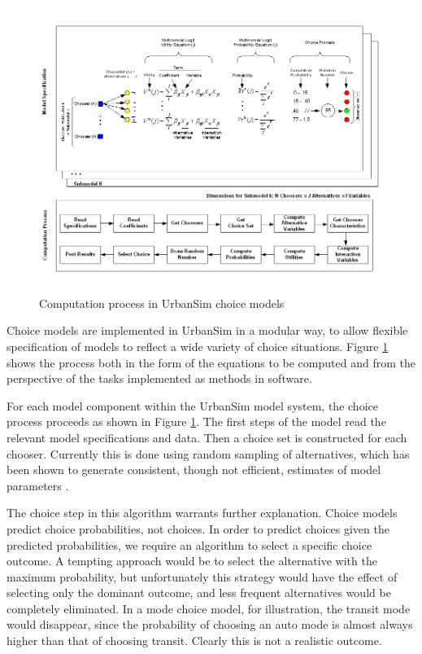 \begin{figure}[htbp]
    \center
    \includegraphics[width=\textwidth]
    {graphics/ChoiceProcess.png}
    \caption{Computation process in UrbanSim choice models}
    \label{fig:choiceprocess}
\end{figure}

Choice models are implemented in UrbanSim in a modular way, to allow flexible specification of models to reflect a wide variety of choice situations. Figure \ref{fig:choiceprocess} shows the process both in the form of the equations to be computed and from the perspective of the tasks implemented as methods in software.

For each model component within the UrbanSim model system, the choice process proceeds as shown in Figure \ref{fig:choiceprocess}. The first steps of the model read the relevant model specifications and data. Then a choice set is constructed for each chooser. Currently this is done using random sampling of alternatives, which has been shown to generate consistent, though not efficient, estimates of model parameters \citep{ben-akiva-lerman-1987}.

The choice step in this algorithm warrants further explanation. Choice models predict choice probabilities, not choices. In order to predict choices given the predicted probabilities, we require an algorithm to select a specific choice outcome. A tempting approach would be to select the alternative with the maximum probability, but unfortunately this strategy would have the effect of selecting only the dominant outcome, and less frequent alternatives would be completely eliminated. In a mode choice model, for illustration, the transit mode would disappear, since the probability of choosing an auto mode is almost always higher than that of choosing transit. Clearly this is not a realistic outcome.

